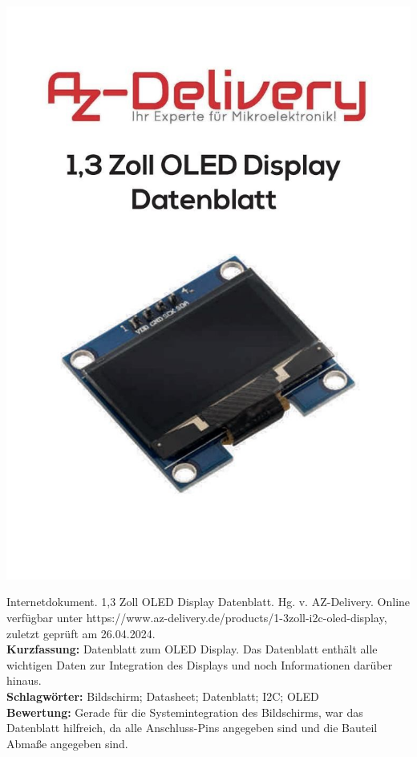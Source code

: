 {
\begin{minipage}{0.38\textwidth}
	\includegraphics[width=\linewidth]{images/AZ.jpg}
\end{minipage}
\hfill
\begin{minipage}{0.6\textwidth}
Internetdokument. 1,3 Zoll OLED Display Datenblatt.
Hg. v. AZ-Delivery. Online verfügbar unter https://www.az-delivery.de/products/1-3zoll-i2c-oled-display, zuletzt geprüft am 26.04.2024.
\\ \textbf{Kurzfassung:}
Datenblatt zum OLED Display. Das Datenblatt enthält alle wichtigen Daten zur Integration des Displays und noch Informationen darüber hinaus.	
\\ \textbf{Schlagwörter:}
Bildschirm; Datasheet; Datenblatt; I2C; OLED
\\ \textbf{Bewertung:}
Gerade für die Systemintegration des Bildschirms, war das Datenblatt hilfreich, da alle Anschluss-Pins angegeben sind und die Bauteil Abmaße angegeben sind.
\end{minipage}
}

